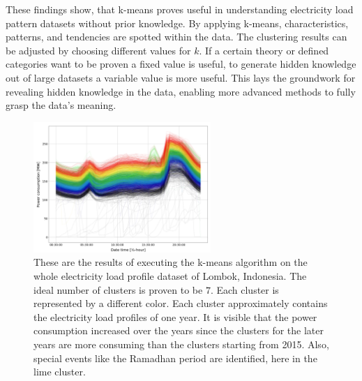 These findings show, that k-means proves useful in understanding electricity load pattern datasets without prior knowledge.
By applying k-means, characteristics, patterns, and tendencies are spotted within the data.
The clustering results can be adjusted by choosing different values for $k$.
If a certain theory or defined categories want to be proven a fixed value is useful, to generate hidden knowledge out of large datasets a variable value is more useful.
This lays the groundwork for revealing hidden knowledge in the data, enabling more advanced methods to fully grasp the data's meaning.

\begin{figure}[H]
    \centering
    \includegraphics[width=0.6\textwidth]{figures/jessen_ndImpactedClusters/jessen_wholeDataClustering.png}
    \caption{These are the results of executing the k-means algorithm on the whole electricity load profile dataset of Lombok, Indonesia.
    The ideal number of clusters is proven to be $7$.
    Each cluster is represented by a different color.
    Each cluster approximately contains the electricity load profiles of one year.
    It is visible that the power consumption increased over the years since the clusters for the later years are more consuming than the clusters starting from 2015.
    Also, special events like the Ramadhan period are identified, here in the lime cluster.
    }
    \label{fig:whole_data_clustering_results}
\end{figure}

